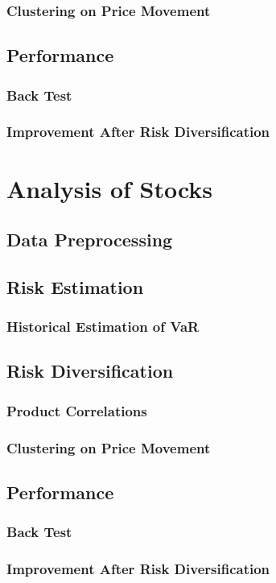 \documentclass[11pt]{article} %
\theoremstyle{plain}
\theoremstyle{definition}
\begin{document}
\subsubsection{Clustering on Price Movement}
\subsection{Performance}
\subsubsection{Back Test}
\subsubsection{Improvement After Risk Diversification}

\section{Analysis of Stocks}
\subsection{Data Preprocessing}
\subsection{Risk Estimation}
\subsubsection{Historical Estimation of VaR}
\subsection{Risk Diversification}
\subsubsection{Product Correlations}
\subsubsection{Clustering on Price Movement}
\subsection{Performance}
\subsubsection{Back Test}
\subsubsection{Improvement After Risk Diversification}
\end{document}
